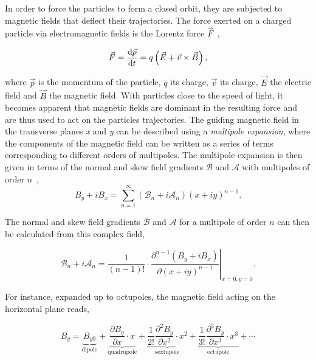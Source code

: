 In order to force the particles to form a closed orbit, they are subjected to magnetic fields that
deflect their trajectories. The force exerted on a charged particle via electromagnetic fields is
the Lorentz force $\vec{F}$~\cite{wiedemann_particle_2015},

\begin{equation}
    \vec{F} = \frac{\mathop{}\!\mathrm{d} \vec{p}}{\mathop{}\!\mathrm{d} t} = q \left( \vec{E} + \vec{v} \times \vec{B} \right),
\end{equation}

where $\vec{p}$ is the momentum of the particle, $q$ its charge, $\vec{v}$ its charge, $\vec{E}$ the
electric field and $\vec{B}$ the magnetic field. With particles close to the speed of light, it
becomes apparent that magnetic fields are dominant in the resulting force and are thus used to act
on the particles trajectories.
The guiding magnetic field in the transverse planes \textit{x} and \textit{y} can be described using
a \textit{multipole expansion}, where the components of the magnetic field can be written as a
series of terms corresponding to different orders of multipoles. The multipole expansion is then
given in terms of the normal and skew field gradients $\mathcal{B}$ and $\mathcal{A}$ with
multipoles of order $n$~\cite{wolf_engineering_2001},
\begin{equation}
    B_y + iB_x = \sum_{n=1}^\infty \left(\mathcal{B}_n + i\mathcal{A}_n \right)  (x+iy)^{n-1}.
\end{equation}

The normal and skew field gradients $\mathcal{B}$ and $\mathcal{A}$ for a multipole of order $n$ can
then be calculated from this complex field,

\begin{equation}
    \mathcal{B}_n + i\mathcal{A}_n = \left.\frac{1}{(n-1)!} \cdot \frac{\partial^{n-1}\left(B_y + iB_x\right)}{\partial(x+iy)^{n-1}}\right|_{x=0,y=0}.
\end{equation}

For instance, expanded up to octupoles, the magnetic field acting on the horizontal plane reads,

\begin{equation}
    B_y = \underbrace{B_{y0}}_{\textrm{dipole}}
        + \underbrace{\frac{\partial B_y}{\partial x} \cdot x}_{\textrm{quadrupole}}
        + \underbrace{\frac{1}{2!} \frac{\partial^2 B_y}{\partial x^2} \cdot x^2}_{\textrm{sextupole}}
        + \underbrace{\frac{1}{3!} \frac{\partial^3 B_y}{\partial x^3} \cdot x^3}_{\textrm{octupole}}
        + \cdots
\end{equation}

